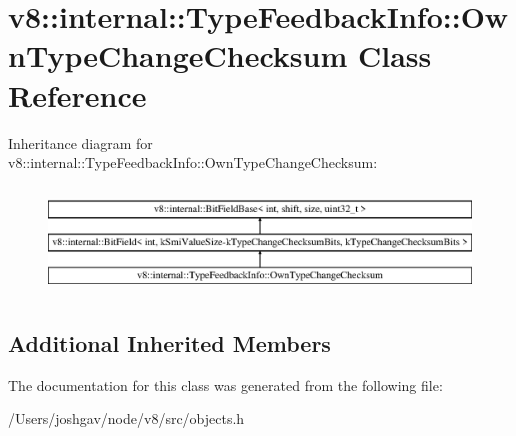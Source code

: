 \hypertarget{classv8_1_1internal_1_1_type_feedback_info_1_1_own_type_change_checksum}{}\section{v8\+:\+:internal\+:\+:Type\+Feedback\+Info\+:\+:Own\+Type\+Change\+Checksum Class Reference}
\label{classv8_1_1internal_1_1_type_feedback_info_1_1_own_type_change_checksum}
Inheritance diagram for v8\+:\+:internal\+:\+:Type\+Feedback\+Info\+:\+:Own\+Type\+Change\+Checksum\+:\begin{figure}[H]
\begin{center}
\leavevmode
\includegraphics[height=2.862010cm]{classv8_1_1internal_1_1_type_feedback_info_1_1_own_type_change_checksum}
\end{center}
\end{figure}
\subsection*{Additional Inherited Members}


The documentation for this class was generated from the following file\+:\begin{DoxyCompactItemize}
\item 
/\+Users/joshgav/node/v8/src/objects.\+h\end{DoxyCompactItemize}
